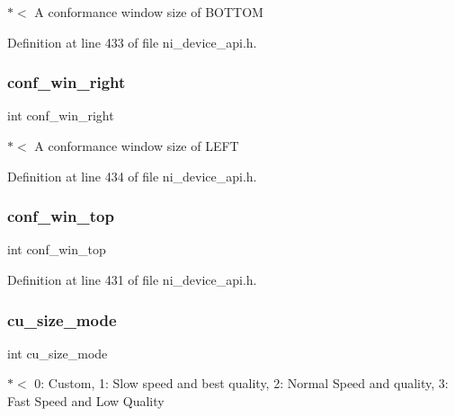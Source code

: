 $\ast$$<$ A conformance window size of B\+O\+T\+T\+OM 

Definition at line 433 of file ni\+\_\+device\+\_\+api.\+h.

\mbox{\label{struct__ni__h265__encoder__params_a5e76f1f86e2dda6acc7bf512ecb5398f}} 
\subsubsection{\texorpdfstring{conf\_win\_right}{conf\_win\_right}}
{\footnotesize\ttfamily int conf\+\_\+win\+\_\+right}

$\ast$$<$ A conformance window size of L\+E\+FT 

Definition at line 434 of file ni\+\_\+device\+\_\+api.\+h.

\mbox{\label{struct__ni__h265__encoder__params_a28675a27ecf8f69841385808fccbe5d2}} 
\subsubsection{\texorpdfstring{conf\_win\_top}{conf\_win\_top}}
{\footnotesize\ttfamily int conf\+\_\+win\+\_\+top}



Definition at line 431 of file ni\+\_\+device\+\_\+api.\+h.

\mbox{\label{struct__ni__h265__encoder__params_afb6a6b097bc20cdd486f8d5080ae3fdb}} 
\subsubsection{\texorpdfstring{cu\_size\_mode}{cu\_size\_mode}}
{\footnotesize\ttfamily int cu\+\_\+size\+\_\+mode}

$\ast$$<$ 0\+: Custom, 1\+: Slow speed and best quality, 2\+: Normal Speed and quality, 3\+: Fast Speed and Low Quality 

